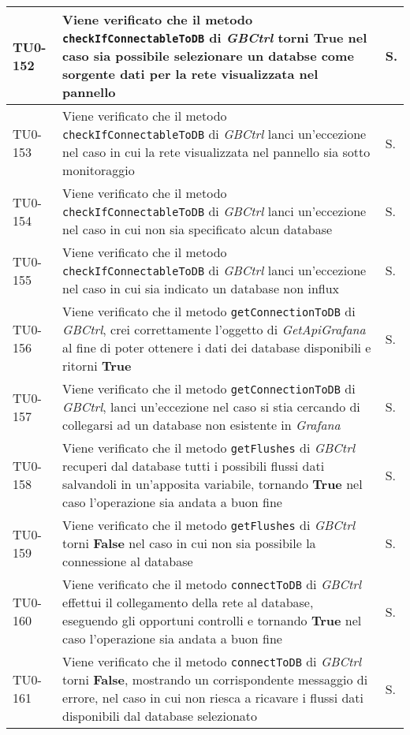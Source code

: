 \begin{longtable}{|C{.15\textwidth}|m{.66\textwidth}|C{.10\textwidth}|}
\hline
TU0-152 & Viene verificato che il metodo \texttt{checkIfConnectableToDB} di \textit{GBCtrl} torni \textbf{True} nel caso sia possibile selezionare un databse come sorgente dati per la rete visualizzata nel pannello & S.\\
\hline
{}TU0-153 & Viene verificato che il metodo \texttt{checkIfConnectableToDB} di \textit{GBCtrl} lanci un'eccezione nel caso in cui la rete visualizzata nel pannello sia sotto monitoraggio & S.\\
\hline
TU0-154 & Viene verificato che il metodo \texttt{checkIfConnectableToDB} di \textit{GBCtrl} lanci un'eccezione nel caso in cui non sia specificato alcun database & S.\\
\hline
{}TU0-155 & Viene verificato che il metodo \texttt{checkIfConnectableToDB} di \textit{GBCtrl} lanci un'eccezione nel caso in cui sia indicato un database non influx & S.\\
\hline
TU0-156 & Viene verificato che il metodo \texttt{getConnectionToDB} di \textit{GBCtrl}, crei correttamente l'oggetto di \textit{GetApiGrafana} al fine di poter ottenere i dati dei database disponibili e ritorni \textbf{True} & S.\\
\hline
{}TU0-157 & Viene verificato che il metodo \texttt{getConnectionToDB} di \textit{GBCtrl}, lanci un'eccezione nel caso si stia cercando di collegarsi ad un database non esistente in \textit{Grafana} & S.\\
\hline
TU0-158 & Viene verificato che il metodo \texttt{getFlushes} di \textit{GBCtrl} recuperi dal database tutti i possibili flussi dati salvandoli in un'apposita variabile, tornando \textbf{True} nel caso l'operazione sia andata a buon fine & S.\\
\hline
{}TU0-159 & Viene verificato che il metodo \texttt{getFlushes} di \textit{GBCtrl} torni \textbf{False} nel caso in cui non sia possibile la connessione al database & S.\\
\hline
TU0-160 & Viene verificato che il metodo \texttt{connectToDB} di \textit{GBCtrl} effettui il collegamento della rete al database, eseguendo gli opportuni controlli e tornando \textbf{True} nel caso l'operazione sia andata a buon fine & S.\\
\hline
{}TU0-161 & Viene verificato che il metodo \texttt{connectToDB} di \textit{GBCtrl} torni \textbf{False}, mostrando un corrispondente messaggio di errore, nel caso in cui non riesca a ricavare i flussi dati disponibili dal database selezionato & S.\\

\end{longtable}

